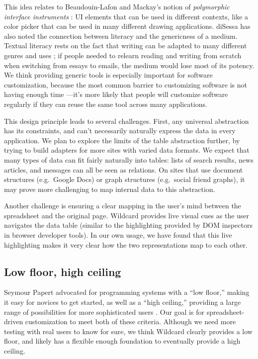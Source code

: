 \documentclass[english,submission]{programming}
\begin{document}
This idea relates to Beaudouin-Lafon and Mackay's notion of
\emph{polymorphic interface instruments} \autocite{beaudouin-lafon2000}:
UI elements that can be used in different contexts, like a color picker
that can be used in many different drawing applications. diSessa has
also noted the connection between literacy and the genericness of a
medium. Textual literacy rests on the fact that writing can be adapted
to many different genres and uses \autocite{disessa2000}; if people
needed to relearn reading and writing from scratch when switching from
essays to emails, the medium would lose most of its potency. We think
providing generic tools is especially important for software
customization, because the most common barrier to customizing software
is not having enough time \autocite{mackay1991}---it's more likely that
people will customize software regularly if they can reuse the same tool
across many applications.

This design principle leads to several challenges. First, any universal
abstraction has its constraints, and can't necessarily naturally express
the data in every application. We plan to explore the limits of the
table abstraction further, by trying to build adapters for more sites
with varied data formats. We expect that many types of data can fit
fairly naturally into tables: lists of search results, news articles,
and messages can all be seen as relations. On sites that use document
structures (e.g.~Google Docs) or graph structures (e.g.~social friend
graphs), it may prove more challenging to map internal data to this
abstraction.

Another challenge is ensuring a clear mapping in the user's mind between
the spreadsheet and the original page. Wildcard provides live visual
cues as the user navigates the data table (similar to the highlighting
provided by DOM inspectors in browser developer tools). In our own
usage, we have found that this live highlighting makes it very clear how
the two representations map to each other.

\hypertarget{low-floor-high-ceiling}{%
\subsection{Low floor, high ceiling}\label{low-floor-high-ceiling}}

Seymour Papert advocated for programming systems with a ``low floor,''
making it easy for novices to get started, as well as a ``high
ceiling,'' providing a large range of possibilities for more
sophisticated users \autocite{resnick2016}. Our goal is for
spreadsheet-driven customization to meet both of these criteria.
Although we need more testing with real users to know for sure, we think
Wildcard clearly provides a low floor, and likely has a flexible enough
foundation to eventually provide a high ceiling.
\end{document}
